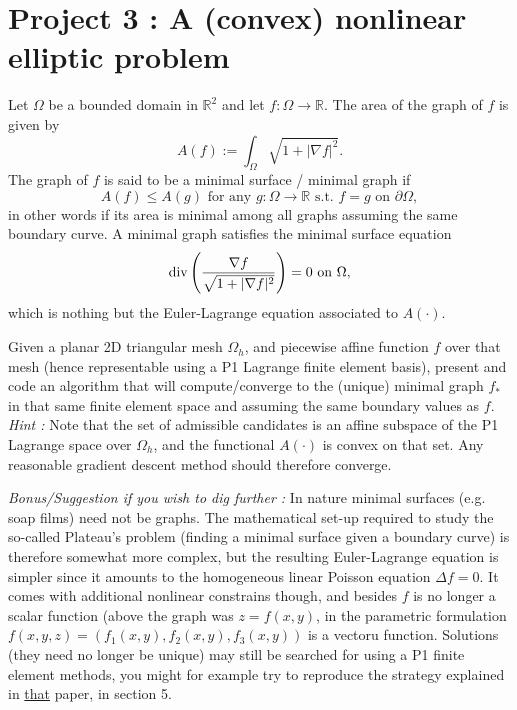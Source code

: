 \documentclass[11pt]{article}
\newcommand{\R}{\mathbb{R}}
\begin{document}
\pagebreak
\section*{Project 3 : A (convex) nonlinear elliptic problem}

Let $\Omega$ be a bounded domain in $\R^2$ and let $f : \Omega \to \R.$ 
The area of the graph of $f$ is given by 
$$
A(f) := \int_\Omega \sqrt{1+ |\nabla f|^2}. 
$$
The graph of $f$ is said to be a minimal surface / minimal graph if
$$
A(f) \leq A(g) \text{ for any } g:\Omega \to \R \text{ s.t. } f=g \text{ on }
\partial \Omega,
$$
in other words if its area is minimal among all graphs assuming the same boundary curve.
A minimal graph satisfies the minimal surface equation 
$$
{\rm div}\left( \frac{\nabla f}{\sqrt{1 + |\nabla f|^2}}\right) = 0 \text{ on } \Omega,
$$
which is nothing but the Euler-Lagrange equation associated to $A(\cdot).$

Given a planar 2D triangular mesh $\Omega_h$, and piecewise affine 
function $f$ over that mesh (hence representable using a P1 Lagrange finite
element basis), present and code an algorithm that will compute/converge to the
(unique) minimal graph $f_*$ in that same finite element space and assuming
the same boundary values as $f$.\\
{\it Hint :} Note that the set of admissible candidates is an affine subspace of the P1
Lagrange space over $\Omega_h$, and the functional $A(\cdot)$ is convex on that
set. Any reasonable gradient descent method should therefore converge.
 
{\it Bonus/Suggestion if you wish to dig further :}
In nature minimal surfaces (e.g. soap films) need not be graphs. The mathematical 
set-up required to study 
the so-called Plateau's problem (finding a minimal surface given a boundary
curve) is therefore somewhat more complex, but the resulting Euler-Lagrange
equation is simpler since it amounts to the homogeneous linear Poisson equation
$\Delta f = 0.$ It comes with additional nonlinear constrains though, and
besides $f$ is no longer a scalar function (above the graph was $z = f(x,y)$, 
in the parametric formulation $f(x,y,z) = (f_1(x,y), f_2(x,y), f_3(x,y))$ is
a vectoru function. Solutions (they need no longer be unique) may still be searched 
for using a P1 finite element methods, you might for example try to reproduce the 
strategy explained in \href{https://eudml.org/doc/221286}{that} paper, in section 5.
\end{document}
